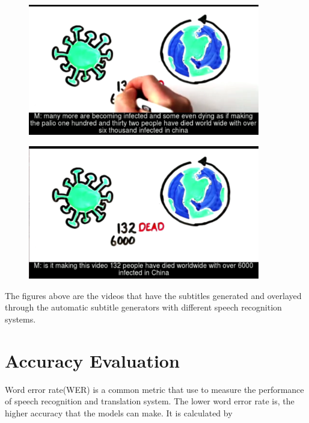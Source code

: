 \documentclass[natbib]{muthesis}
\begin{document}
 \begin{figure}[H]
 	\centering
 	\begin{minipage}{0.5\textwidth}
 		\centering
 		\includegraphics[width=0.9\textwidth]{images/example-video-ds} 
 		\label{fig:example-video-ds}
 	\end{minipage}\hfill
 	\begin{minipage}{0.5\textwidth}
 		\centering
 		\includegraphics[width=0.9\textwidth]{images/example-video-gws} 
		\label{fig:example-video-gws}
 	\end{minipage}
 \end{figure}

  The figures above are the videos that have the subtitles generated and overlayed through the automatic subtitle generators with different speech recognition systems.
  
 \section{Accuracy Evaluation}
 
 Word error rate(WER) is a common metric that use to measure the performance of speech recognition and translation system. The lower word error rate is, the higher accuracy that the models can make. It is calculated by
 
\end{document}

